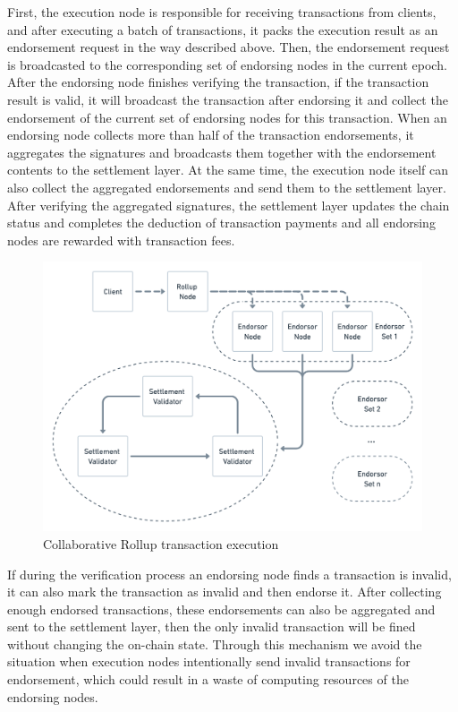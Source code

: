 \documentclass{iacrtrans}
\begin{document}
First, the execution node is responsible for receiving transactions from clients, and after executing a batch of transactions, it packs the execution result as an endorsement request in the way described above. Then, the endorsement request is broadcasted to the corresponding set of endorsing nodes in the current epoch. After the endorsing node finishes verifying the transaction, if the transaction result is valid, it will broadcast the transaction after endorsing it and collect the endorsement of the current set of endorsing nodes for this transaction. When an endorsing node collects more than half of the transaction endorsements, it aggregates the signatures and broadcasts them together with the endorsement contents to the settlement layer. At the same time, the execution node itself can also collect the aggregated endorsements and send them to the settlement layer. After verifying the aggregated signatures, the settlement layer updates the chain status and completes the deduction of transaction payments and all endorsing nodes are rewarded with transaction fees.

\begin{figure}[!htbp]
	\centering
	\includegraphics[width=0.8 \textwidth]{images/5.png}
	\caption{Collaborative Rollup transaction execution}
	\label{fig:5} 
\end{figure}

If during the verification process an endorsing node finds a transaction is invalid, it can also mark the transaction as invalid and then endorse it. After collecting enough endorsed transactions, these endorsements can also be aggregated and sent to the settlement layer, then the only invalid transaction will be fined without changing the on-chain state. Through this mechanism we avoid the situation when execution nodes intentionally send invalid transactions for endorsement, which could result in a waste of computing resources of the endorsing nodes.
\end{document}
